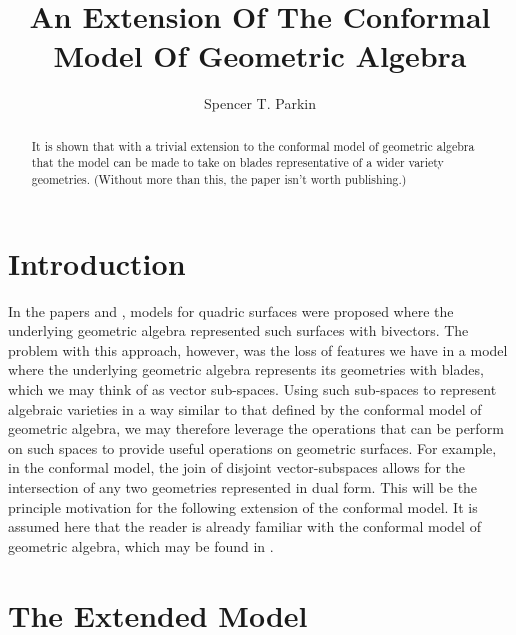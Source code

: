\documentclass{birkjour}
\theoremstyle{definition}
\theoremstyle{remark}
\numberwithin{equation}{section}
\begin{document}
\title{An Extension Of The Conformal Model Of Geometric Algebra}

\author{Spencer T. Parkin}





\begin{abstract}
It is shown that with a trivial extension to the conformal
model of geometric algebra that the model can be made
to take on blades representative of a wider variety geometries.
(Without more than this, the paper isn't worth publishing.)
\end{abstract}

\maketitle

\section{Introduction}

In the papers \cite{} and \cite{}, models for quadric surfaces were proposed
where the underlying geometric algebra represented such surfaces with bivectors.
The problem with this approach, however, was the loss of features we have in a model
where the underlying geometric algebra represents its geometries with blades, which we may
think of as vector sub-spaces.
Using such sub-spaces to represent algebraic varieties in a way similar to that defined by the conformal
model of geometric algebra, we may therefore leverage the operations that can be
perform on such spaces to provide useful operations on geometric surfaces.  For example,
in the conformal model, the join of disjoint vector-subspaces allows for the intersection of any two
geometries represented in dual form.  This will be the principle motivation for the following
extension of the conformal model.  It is assumed here that the reader is already familiar
with the conformal model of geometric algebra, which may be found in \cite{}.

\section{The Extended Model}
\end{document}
